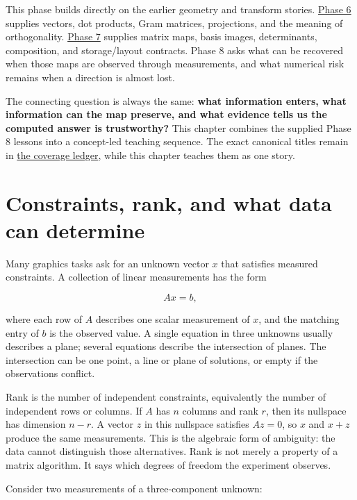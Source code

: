 This phase builds directly on the earlier geometry and transform stories. \hyperref[01-foundations-i-ch017-the-panel-gives-us-a-reason-to-learn]{Phase 6} supplies vectors, dot products, Gram matrices, projections, and the meaning of orthogonality. \hyperref[01-foundations-i-ch018-keep-the-promises-visible-while-moving-between-representations]{Phase 7} supplies matrix maps, basis images, determinants, composition, and storage/layout contracts. Phase 8 asks what can be recovered when those maps are observed through measurements, and what numerical risk remains when a direction is almost lost.

The connecting question is always the same: \textbf{what information enters, what information can the map preserve, and what evidence tells us the computed answer is trustworthy?} This chapter combines the supplied Phase 8 lessons into a concept-led teaching sequence. The exact canonical titles remain in \hyperref[appendix-fd090d982a15-phase-8---parts-701-800]{the coverage ledger}, while this chapter teaches them as one story.

\section{Constraints, rank, and what data can determine}\label{01-foundations-i-ch019-constraints-rank-and-what-data-can-determine}

Many graphics tasks ask for an unknown vector \(x\) that satisfies measured constraints. A collection of linear measurements has the form

\[
Ax=b,
\]

where each row of \(A\) describes one scalar measurement of \(x\), and the matching entry of \(b\) is the observed value. A single equation in three unknowns usually describes a plane; several equations describe the intersection of planes. The intersection can be one point, a line or plane of solutions, or empty if the observations conflict.

Rank is the number of independent constraints, equivalently the number of independent rows or columns. If \(A\) has \(n\) columns and rank \(r\), then its nullspace has dimension \(n-r\). A vector \(z\) in this nullspace satisfies \(Az=0\), so \(x\) and \(x+z\) produce the same measurements. This is the algebraic form of ambiguity: the data cannot distinguish those alternatives. Rank is not merely a property of a matrix algorithm. It says which degrees of freedom the experiment observes.

Consider two measurements of a three-component unknown:

